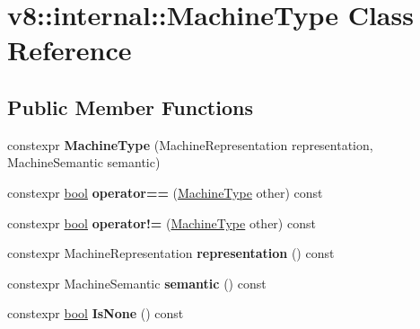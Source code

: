 \hypertarget{classv8_1_1internal_1_1MachineType}{}\section{v8\+:\+:internal\+:\+:Machine\+Type Class Reference}
\label{classv8_1_1internal_1_1MachineType}
\subsection*{Public Member Functions}
\begin{DoxyCompactItemize}
\item 
\mbox{\label{classv8_1_1internal_1_1MachineType_a23461c2b848aec9ea763b26867255815}} 
constexpr {\bfseries Machine\+Type} (Machine\+Representation representation, Machine\+Semantic semantic)
\item 
\mbox{\label{classv8_1_1internal_1_1MachineType_a97b04efb188ab8014d5be68c849d23b8}} 
constexpr \mbox{\hyperlink{classbool}{bool}} {\bfseries operator==} (\mbox{\hyperlink{classv8_1_1internal_1_1MachineType}{Machine\+Type}} other) const
\item 
\mbox{\label{classv8_1_1internal_1_1MachineType_a6a343ff525cdd8c07d8db2bfcb9d6780}} 
constexpr \mbox{\hyperlink{classbool}{bool}} {\bfseries operator!=} (\mbox{\hyperlink{classv8_1_1internal_1_1MachineType}{Machine\+Type}} other) const
\item 
\mbox{\label{classv8_1_1internal_1_1MachineType_a4270f8a7c5ea5a4abd4f28ee46271a3a}} 
constexpr Machine\+Representation {\bfseries representation} () const
\item 
\mbox{\label{classv8_1_1internal_1_1MachineType_a1356e009d754622824b7b76a63f23688}} 
constexpr Machine\+Semantic {\bfseries semantic} () const
\item 
\mbox{\label{classv8_1_1internal_1_1MachineType_a4d784b85f285a72fd4509e40c5b70cf0}} 
constexpr \mbox{\hyperlink{classbool}{bool}} {\bfseries Is\+None} () const
\item 
\mbox{\label{classv8_1_1internal_1_1MachineType_a283845639a3662aa7aba4666b67eebbc}} 

\end{DoxyCompactItemize}
